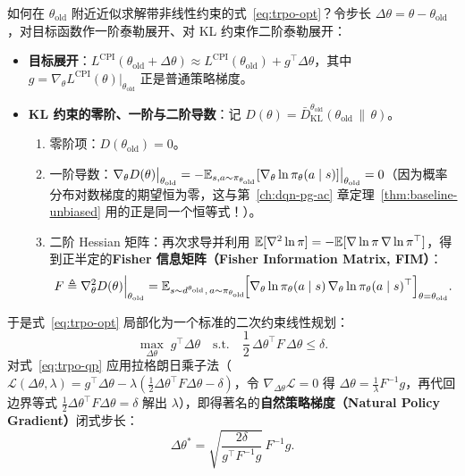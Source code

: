 如何在 $\theta_{\mathrm{old}}$ 附近近似求解带非线性约束的式~\eqref{eq:trpo-opt}？令步长 $\Delta\theta = \theta - \theta_{\mathrm{old}}$，对目标函数作一阶泰勒展开、对 KL 约束作二阶泰勒展开：
\begin{itemize}
  \item \textbf{目标展开}：$L^{\mathrm{CPI}}(\theta_{\mathrm{old}} + \Delta\theta) \approx L^{\mathrm{CPI}}(\theta_{\mathrm{old}}) + g^\top \Delta\theta$，其中 $g = \nabla_\theta L^{\mathrm{CPI}}(\theta)\big|_{\theta_{\mathrm{old}}}$ 正是普通策略梯度。
  \item \textbf{KL 约束的零阶、一阶与二阶导数}：记 $D(\theta) = \bar{D}_{\mathrm{KL}}^{\theta_{\mathrm{old}}}(\theta_{\mathrm{old}} \,\|\, \theta)$。
  \begin{enumerate}
    \item 零阶项：$D(\theta_{\mathrm{old}}) = 0$。
    \item 一阶导数：$\nabla_\theta D(\theta)\big|_{\theta_{\mathrm{old}}} = -\mathbb{E}_{s, a\sim \pi_{\theta_{\mathrm{old}}}}[\nabla_\theta \ln \pi_\theta(a\mid s)]\big|_{\theta_{\mathrm{old}}} = 0$（因为概率分布对数梯度的期望恒为零，这与第~\ref{ch:dqn-pg-ac} 章定理~\ref{thm:baseline-unbiased} 用的正是同一个恒等式！）。
    \item 二阶 Hessian 矩阵：再次求导并利用 $\mathbb{E}[\nabla^2 \ln \pi] = -\mathbb{E}[\nabla \ln \pi\,\nabla \ln \pi^\top]$，得到正半定的\textbf{Fisher 信息矩阵（Fisher Information Matrix, FIM）}：
    \begin{equation}
      F \triangleq \nabla_\theta^2 D(\theta)\Big|_{\theta_{\mathrm{old}}}
      = \mathbb{E}_{s \sim d^{\theta_{\mathrm{old}}},\, a \sim \pi_{\theta_{\mathrm{old}}}}\!\Big[\nabla_\theta \ln \pi_\theta(a \mid s)\,\nabla_\theta \ln \pi_\theta(a \mid s)^\top\Big]_{\theta=\theta_{\mathrm{old}}}.
      \label{eq:fisher-matrix}
    \end{equation}
  \end{enumerate}
\end{itemize}
于是式~\eqref{eq:trpo-opt} 局部化为一个标准的二次约束线性规划：
\begin{equation}
  \max_{\Delta\theta} \; g^\top \Delta\theta \quad \text{s.t.} \quad \frac{1}{2}\,\Delta\theta^\top F\, \Delta\theta \le \delta.
  \label{eq:trpo-qp}
\end{equation}
对式~\eqref{eq:trpo-qp} 应用拉格朗日乘子法（$\mathcal{L}(\Delta\theta, \lambda) = g^\top \Delta\theta - \lambda(\frac{1}{2}\Delta\theta^\top F\Delta\theta - \delta)$，令 $\nabla_{\Delta\theta}\mathcal{L} = 0$ 得 $\Delta\theta = \frac{1}{\lambda} F^{-1} g$，再代回边界等式 $\frac{1}{2}\Delta\theta^\top F\Delta\theta = \delta$ 解出 $\lambda$），即得著名的\textbf{自然策略梯度（Natural Policy Gradient）}闭式步长：
\begin{equation}
  \Delta\theta^* = \sqrt{\frac{2\delta}{g^\top F^{-1} g}}\, F^{-1} g.
  \label{eq:npg-step}
\end{equation}

